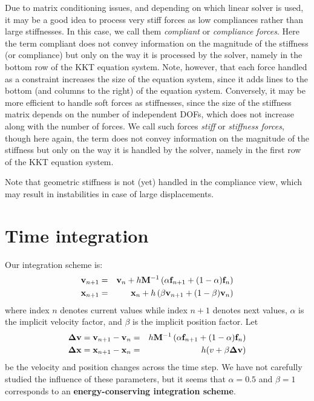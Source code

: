 Due to matrix conditioning issues, and depending on which linear solver is used, it may be a good idea to process very stiff forces as low compliances rather than large stiffnesses. 
In this case, we call them \textit{compliant} or \textit{compliance forces}. Here the term compliant does not convey information on the magnitude of the stiffness (or compliance) but only on the way it is processed by the solver, namely in the bottom row of the KKT equation system.
Note, however, that each force handled as a constraint increases the size of the equation system, since it adds lines to the bottom (and columns to the right) of the equation system.
Conversely, it may be more efficient to handle soft forces as stiffnesses, since the size of the stiffness matrix depends on the number of independent DOFs, which does not increase along with the number of forces. We call such forces \textit{stiff} or \textit{stiffness forces}, though here again, the term does not convey information on the magnitude of the stiffness but only on the way it is handled by the solver, namely in the first row of the KKT equation system.

Note that geometric stiffness is not (yet) handled in the compliance view, which may result in instabilities in case of large displacements.


\section{Time integration} \label{sec:time integration}
Our integration scheme is:
\begin{eqnarray}
 \mathbf{v}_{n+1} &=& \mathbf{v}_{n} + h \mathbf{M}^{-1} \left(\alpha \mathbf{f}_{n+1} + (1-\alpha) \mathbf{f}_{n}\right) \label{eq ode velocity} \\
  \mathbf{x}_{n+1} &=& \mathbf{x}_{n} + h \left( \beta \mathbf{v}_{n+1} + (1-\beta) \mathbf{v}_{n} \right) \label{eq ode position}
\end{eqnarray}
where index $n$ denotes current values while index $n+1$ denotes next values, $\alpha$ is the implicit velocity factor, and $\beta$ is the implicit position factor. Let
\begin{eqnarray}
 \mathbf{\Delta v} = \mathbf{v}_{n+1} -    \mathbf{v}_{n}  &=& h \mathbf{M}^{-1} \left(\alpha \mathbf{f}_{n+1} + (1-\alpha) \mathbf{f}_{n}\right) \\
\mathbf{\Delta x} = \mathbf{x}_{n+1} -  \mathbf{x}_{n}    &=& h (v + \beta  \mathbf{\Delta v})
\end{eqnarray}
be the velocity and position changes across the time step.
We have not carefully studied the influence of these parameters, but it seems that $\alpha=0.5$ and $\beta=1$ corresponds to an \textbf{energy-conserving integration scheme}.


